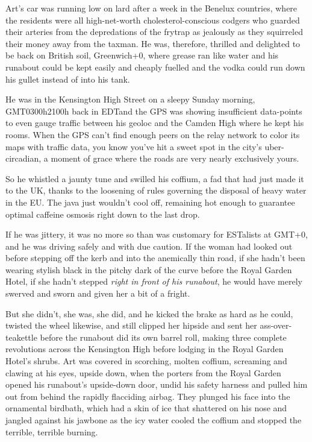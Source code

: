 Art’s car was running low on lard after a week in the Benelux
countries, where the residents were all high-net-worth
cholesterol-conscious codgers who guarded their arteries from the
depredations of the frytrap as jealously as they squirreled their
money away from the taxman. He was, therefore, thrilled and
delighted to be back on British soil, Greenwich+0, where grease ran
like water and his runabout could be kept easily and cheaply
fuelled and the vodka could run down his gullet instead of into his
tank.

He was in the Kensington High Street on a sleepy Sunday morning,
GMT0300h{\dash}2100h back in EDT{\dash}and the GPS was showing insufficient
data-points to even gauge traffic between his geoloc and the Camden
High where he kept his rooms. When the GPS can’t find enough peers
on the relay network to color its maps with traffic data, you know
you’ve hit a sweet spot in the city’s uber-circadian, a moment of
grace where the roads are very nearly exclusively yours.

So he whistled a jaunty tune and swilled his coffium, a fad that
had just made it to the UK, thanks to the loosening of rules
governing the disposal of heavy water in the EU. The java just
wouldn’t cool off, remaining hot enough to guarantee optimal
caffeine osmosis right down to the last drop.

If he was jittery, it was no more so than was customary for
ESTalists at GMT+0, and he was driving safely and with due caution.
If the woman had looked out before stepping off the kerb and into
the anemically thin road, if she hadn’t been wearing stylish black
in the pitchy dark of the curve before the Royal Garden Hotel, if
she hadn’t stepped \emph{right in front of his runabout}, he would
have merely swerved and sworn and given her a bit of a fright.

But she didn’t, she was, she did, and he kicked the brake as hard
as he could, twisted the wheel likewise, and still clipped her
hipside and sent her ass-over-teakettle before the runabout did its
own barrel roll, making three complete revolutions across the
Kensington High before lodging in the Royal Garden Hotel’s shrubs.
Art was covered in scorching, molten coffium, screaming and clawing
at his eyes, upside down, when the porters from the Royal Garden
opened his runabout’s upside-down door, undid his safety harness
and pulled him out from behind the rapidly flacciding airbag. They
plunged his face into the ornamental birdbath, which had a skin of
ice that shattered on his nose and jangled against his jawbone as
the icy water cooled the coffium and stopped the terrible, terrible
burning.


